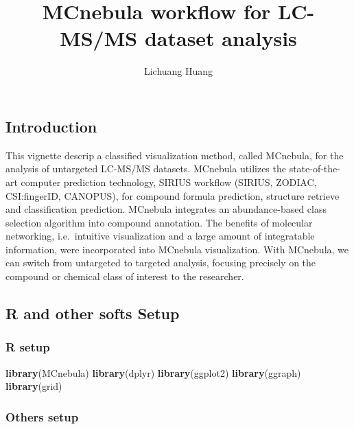\documentclass[]{tufte-handout}
\title{MCnebula workflow for LC-MS/MS dataset analysis}
\author{Lichuang Huang}
\date{}
\newenvironment{Shaded}{}{}
\newcommand{\KeywordTok}[1]{\textcolor[rgb]{0.00,0.44,0.13}{\textbf{#1}}}
\newcommand{\NormalTok}[1]{#1}
\begin{document}
\maketitle




\hypertarget{introduction}{%
\subsection{Introduction}\label{introduction}}

This vignette descrip a classified visualization method, called
MCnebula, for the analysis of untargeted LC-MS/MS datasets. MCnebula
utilizes the state-of-the-art computer prediction technology, SIRIUS
workflow (SIRIUS, ZODIAC, CSI:fingerID, CANOPUS), for compound formula
prediction, structure retrieve and classification prediction. MCnebula
integrates an abundance-based class selection algorithm into compound
annotation. The benefits of molecular networking, i.e.~intuitive
visualization and a large amount of integratable information, were
incorporated into MCnebula visualization. With MCnebula, we can switch
from untargeted to targeted analysis, focusing precisely on the compound
or chemical class of interest to the researcher.

\hypertarget{r-and-other-softs-setup}{%
\subsection{R and other softs Setup}\label{r-and-other-softs-setup}}

\hypertarget{r-setup}{%
\subsubsection{R setup}\label{r-setup}}

\begin{Shaded}
\begin{Highlighting}[]
\KeywordTok{library}\NormalTok{(MCnebula)}
\KeywordTok{library}\NormalTok{(dplyr)}
\KeywordTok{library}\NormalTok{(ggplot2)}
\KeywordTok{library}\NormalTok{(ggraph)}
\KeywordTok{library}\NormalTok{(grid)}
\end{Highlighting}
\end{Shaded}

\hypertarget{others-setup}{%
\subsubsection{Others setup}\label{others-setup}}
\end{document}
